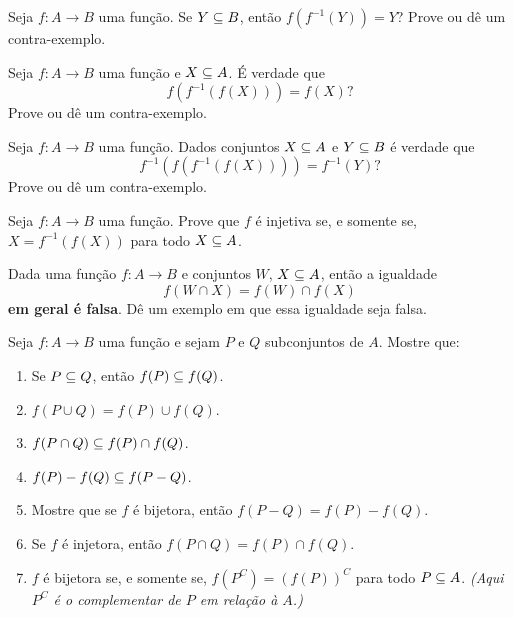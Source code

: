 \documentclass[12pt]{exam}
\begin{document}
    \vspace{.3cm}

    \questao{} Seja $f : A \to B$ uma fun\c{c}\~ao. Se $Y \subseteq B$, ent\~ao $f(f^{-1}(Y)) = Y$? Prove ou d\^e um contra-exemplo.

    \vspace{.3cm}

    \questao{} Seja $f : A \to B$ uma fun\c{c}\~ao e $X \subseteq A$. \'E verdade que
    \[
        f(f^{-1}(f(X))) = f(X)?
    \]
    Prove ou d\^e um contra-exemplo.

    \vspace{.3cm}

    \questao{} Seja $f : A \to B$ uma fun\c{c}\~ao. Dados conjuntos $X \subseteq A$ e $Y \subseteq B$ \'e verdade que
    \[
        f^{-1}(f(f^{-1}(f(X)))) = f^{-1}(Y)?
    \]
    Prove ou d\^e um contra-exemplo.

    \vspace{.3cm}

    \questao{} Seja $f : A \to B$ uma fun\c{c}\~ao. Prove que $f$ \'e injetiva se, e somente se, $X = f^{-1}(f(X))$ para todo $X \subseteq A$.

    \vspace{.3cm}

    \questao{} Dada uma fun\c{c}\~ao $f : A \to B$ e conjuntos $W$, $X \subseteq A$, ent\~ao a igualdade
    \[
        f(W \cap X) = f(W) \cap f(X)
    \]
    \textbf{em geral \'e falsa}. D\^e um exemplo em que essa igualdade seja falsa.

    \vspace{.3cm}

    \questao{} Seja $f : A \to B$ uma fun\c{c}\~ao e sejam $P$ e $Q$ subconjuntos de $A$. Mostre que:
    \begin{enumerate}[label={\alph*})]
        \item Se $P\subseteq Q$, ent{\~a}o $f(P)\subseteq f(Q)$.
        \item $f(P\cup Q) = f(P)\cup f(Q)$.

        \item $f(P\cap Q)\subseteq f(P)\cap f(Q)$.

        \item $f(P) - f(Q) \subseteq f(P - Q)$.

        \item Mostre que se $f$ é bijetora, então $f(P - Q) = f(P) - f(Q)$.

        \item Se $f$ {\'e} injetora, ent{\~a}o $f(P\cap Q) =  f(P)\cap f(Q)$.

        \item $f$ {\'e} bijetora se, e somente se, $f(P^C) = (f(P))^C$ para todo $P \subseteq A$. \textit{(Aqui $P^C$ \'e o complementar de $P$ em rela\c{c}\~ao \`a $A$.)}
    \end{enumerate}
\end{document}
